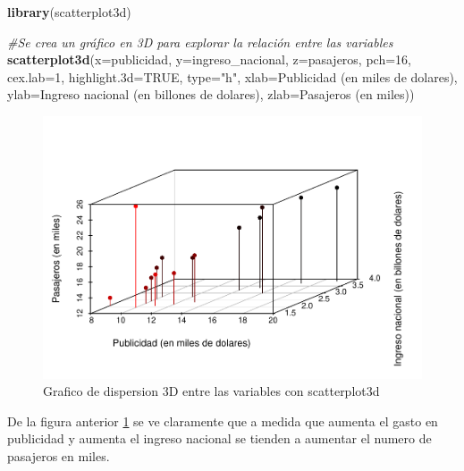 \documentclass[
]{book}
\newenvironment{Shaded}{\begin{snugshade}}{\end{snugshade}}
\newcommand{\AttributeTok}[1]{\textcolor[rgb]{0.13,0.29,0.53}{#1}}
\newcommand{\CommentTok}[1]{\textcolor[rgb]{0.56,0.35,0.01}{\textit{#1}}}
\newcommand{\ConstantTok}[1]{\textcolor[rgb]{0.56,0.35,0.01}{#1}}
\newcommand{\DecValTok}[1]{\textcolor[rgb]{0.00,0.00,0.81}{#1}}
\newcommand{\FunctionTok}[1]{\textcolor[rgb]{0.13,0.29,0.53}{\textbf{#1}}}
\newcommand{\NormalTok}[1]{#1}
\newcommand{\StringTok}[1]{\textcolor[rgb]{0.31,0.60,0.02}{#1}}
\begin{document}
\begin{Shaded}
\begin{Highlighting}[]
\FunctionTok{library}\NormalTok{(scatterplot3d)}

\CommentTok{\#Se crea un gráfico en 3D para explorar la relación entre las variables}
\FunctionTok{scatterplot3d}\NormalTok{(}\AttributeTok{x=}\NormalTok{publicidad, }\AttributeTok{y=}\NormalTok{ingreso\_nacional, }\AttributeTok{z=}\NormalTok{pasajeros, }\AttributeTok{pch=}\DecValTok{16}\NormalTok{, }\AttributeTok{cex.lab=}\DecValTok{1}\NormalTok{,}
              \AttributeTok{highlight.3d=}\ConstantTok{TRUE}\NormalTok{, }\AttributeTok{type=}\StringTok{"h"}\NormalTok{, }\AttributeTok{xlab=}\StringTok{\textquotesingle{}Publicidad (en miles de dolares)\textquotesingle{}}\NormalTok{,}
              \AttributeTok{ylab=}\StringTok{\textquotesingle{}Ingreso nacional (en billones de dolares)\textquotesingle{}}\NormalTok{, }\AttributeTok{zlab=}\StringTok{\textquotesingle{}Pasajeros (en miles)\textquotesingle{}}\NormalTok{)}
\end{Highlighting}
\end{Shaded}

\begin{figure}
\centering
\includegraphics{_main_files/figure-latex/explorscatter-1.pdf}
\caption{\label{fig:explorscatter}Grafico de dispersion 3D entre las variables con scatterplot3d}
\end{figure}

De la figura anterior \ref{fig:explorscatter} se ve claramente que a medida que aumenta el gasto en publicidad y aumenta el ingreso nacional se tienden a aumentar el numero de pasajeros en miles.
\end{document}
